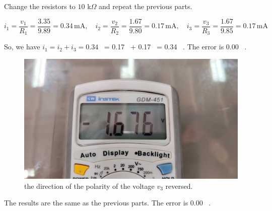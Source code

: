 \documentclass[11pt]{article}
\newcommand{\PicScale}{0.2}
\begin{document}
\begin{question}
\begin{subquestion}{Change the resistors to $10$ k$\Omega$ and repeat the previous parts. }
{            \[
                i_1 = \frac{v_1}{R_1} = \frac{3.35}{9.89} = 0.34 \, \text{mA}, \quad
                i_2 = \frac{v_2}{R_2} = \frac{1.67}{9.80} = 0.17 \, \text{mA}, \quad
                i_3 = \frac{v_3}{R_3} = \frac{1.67}{9.85} = 0.17 \, \text{mA}
            \]

            So, we have $i_1 = i_2 + i_3 = 0.34$ \,  = 0.17 \,  + 0.17 \, 
             = 0.34 \, . The error is 0.00 \, .

            \begin{figure}[H]
                \centering
                \includegraphics[scale=\PicScale,angle=0]{Fig/13.jpeg}
                \caption{the direction of the polarity of the voltage $v_3$ reversed.}
            \end{figure}

            The results are the same as the previous parts. The error is 0.00 \, .

        }
    \end{subquestion}

\end{question}

\end{document}
